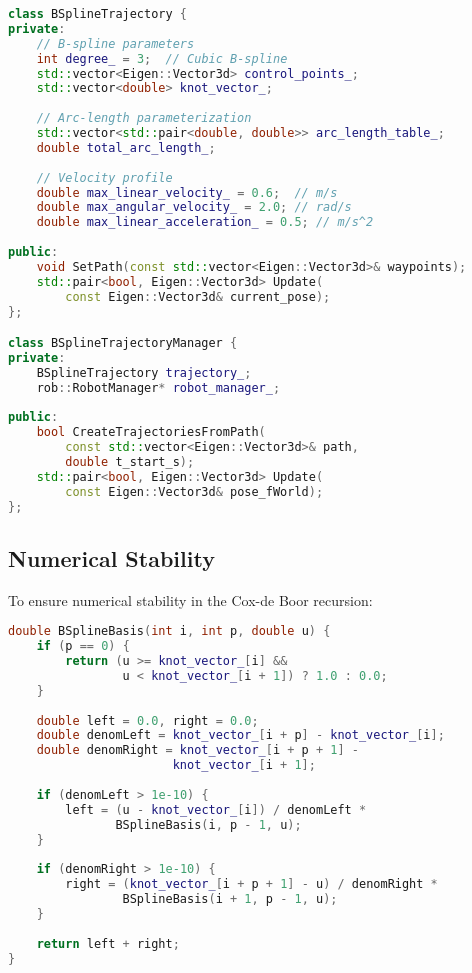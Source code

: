 \documentclass[11pt]{article}
\begin{document}
\begin{lstlisting}[language=C++, caption=Main Class Structure]
class BSplineTrajectory {
private:
    // B-spline parameters
    int degree_ = 3;  // Cubic B-spline
    std::vector<Eigen::Vector3d> control_points_;
    std::vector<double> knot_vector_;
    
    // Arc-length parameterization
    std::vector<std::pair<double, double>> arc_length_table_;
    double total_arc_length_;
    
    // Velocity profile
    double max_linear_velocity_ = 0.6;  // m/s
    double max_angular_velocity_ = 2.0; // rad/s
    double max_linear_acceleration_ = 0.5; // m/s^2
    
public:
    void SetPath(const std::vector<Eigen::Vector3d>& waypoints);
    std::pair<bool, Eigen::Vector3d> Update(
        const Eigen::Vector3d& current_pose);
};

class BSplineTrajectoryManager {
private:
    BSplineTrajectory trajectory_;
    rob::RobotManager* robot_manager_;
    
public:
    bool CreateTrajectoriesFromPath(
        const std::vector<Eigen::Vector3d>& path,
        double t_start_s);
    std::pair<bool, Eigen::Vector3d> Update(
        const Eigen::Vector3d& pose_fWorld);
};
\end{lstlisting}

\subsection{Numerical Stability}

To ensure numerical stability in the Cox-de Boor recursion:

\begin{lstlisting}[language=C++, caption=Stable Basis Function Evaluation]
double BSplineBasis(int i, int p, double u) {
    if (p == 0) {
        return (u >= knot_vector_[i] && 
                u < knot_vector_[i + 1]) ? 1.0 : 0.0;
    }
    
    double left = 0.0, right = 0.0;
    double denomLeft = knot_vector_[i + p] - knot_vector_[i];
    double denomRight = knot_vector_[i + p + 1] - 
                       knot_vector_[i + 1];
    
    if (denomLeft > 1e-10) {
        left = (u - knot_vector_[i]) / denomLeft * 
               BSplineBasis(i, p - 1, u);
    }
    
    if (denomRight > 1e-10) {
        right = (knot_vector_[i + p + 1] - u) / denomRight * 
                BSplineBasis(i + 1, p - 1, u);
    }
    
    return left + right;
}
\end{lstlisting}
\end{document}

